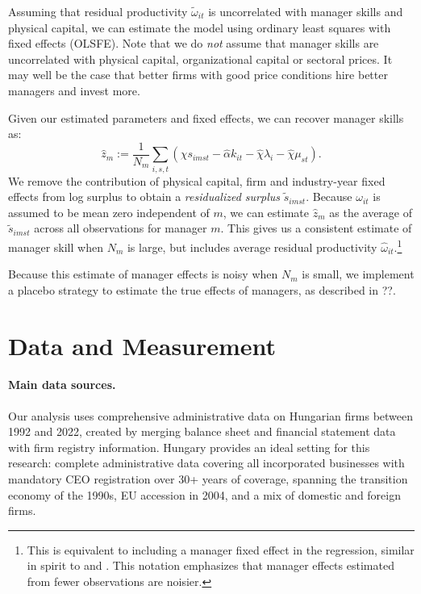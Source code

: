 Assuming that residual productivity $\tilde\omega_{it}$ is uncorrelated with manager skills and physical capital, we can estimate the model using ordinary least squares with fixed effects (OLSFE). Note that we do \emph{not} assume that manager skills are uncorrelated with physical capital, organizational capital or sectoral prices. It may well be the case that better firms with good price conditions hire better managers and invest more. 

Given our estimated parameters and fixed effects, we can recover manager skills as:
\begin{equation}\label{eq:estimated}
\hat z_m :=
\frac1{N_m}\sum_{i,s,t}(
        \hat\chi s_{imst} -  \hat\alpha k_{it}  -\hat\chi \lambda_i -\hat\chi \mu_{st}
). 
\end{equation}
We remove the contribution of physical capital, firm and industry-year fixed effects from log surplus to obtain a \emph{residualized surplus} $\tilde s_{imst}$. Because $\omega_{it}$ is assumed to be mean zero independent of $m$, we can estimate $\hat z_m$ as the average of $\tilde s_{imst}$ across all observations for manager $m$. This gives us a consistent estimate of manager skill when $N_m$ is large, but includes average residual productivity $\hat\omega_{it}$.\footnote{This is equivalent to including a manager fixed effect in the regression, similar in spirit to \citet{Abowd1999Econometrica} and \citet{Card2018JoLE}. This notation emphasizes that manager effects estimated from fewer observations are noisier.}

Because this estimate of manager effects is noisy when $N_m$ is small, we implement a placebo strategy to estimate the true effects of managers, as described in ??.

\section{Data and Measurement}
\paragraph{Main data sources.} Our analysis uses comprehensive administrative data on Hungarian firms between 1992 and 2022, created by merging balance sheet and financial statement data with firm registry information. Hungary provides an ideal setting for this research: complete administrative data covering all incorporated businesses with mandatory CEO registration over 30+ years of coverage, spanning the transition economy of the 1990s, EU accession in 2004, and a mix of domestic and foreign firms. %

